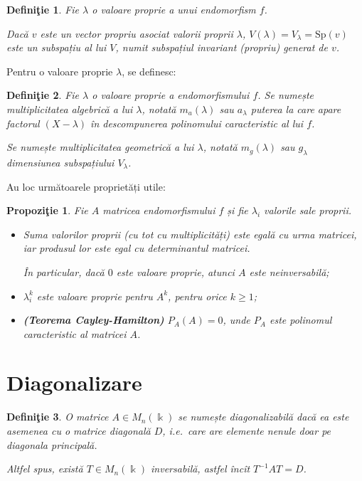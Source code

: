 \documentclass[11pt,a4paper]{article}
\theoremstyle{dotless}
\newtheorem{proposition}{Propozi\c{t}ie}[section]
\theoremstyle{dotlessdr}
\newtheorem{definition}{Defini\c{t}ie}[section]
\begin{document}
\begin{definition}\label{def:sp-invar}
  Fie $\lambda$ o valoare proprie a unui endomorfism $f$.

  Dacă $v$ este un vector propriu asociat valorii proprii $\lambda$,
  $V(\lambda) = V_\lambda = \mathrm{Sp}(v)$ este un subspațiu al lui
  $V$, numit \emph{subspațiul invariant} (propriu) generat de $v$.
\end{definition}

Pentru o valoare proprie $\lambda$, se definesc:

\begin{definition}\label{def:ma-mg}
  Fie $\lambda$ o valoare proprie a endomorfismului $f$. Se numește
  \emph{multiplicitatea algebrică} a lui $\lambda$, notată $m_a(\lambda)$
  sau $a_\lambda$ puterea la care apare factorul $(X - \lambda)$ în descompunerea
  polinomului caracteristic al lui $f$.

  Se numește \emph{multiplicitatea geometrică} a lui $\lambda$, notată $m_g(\lambda)$
  sau $g_\lambda$ dimensiunea subspațiului $V_\lambda$.
\end{definition}

Au loc următoarele proprietăți utile:
\begin{proposition}\label{pr:vvp}
  Fie $A$ matricea endomorfismului $f$ și fie $\lambda_i$ valorile sale proprii.

  \begin{itemize}
  \item Suma valorilor proprii (cu tot cu multiplicități) este egală cu urma
    matricei, iar produsul lor este egal cu determinantul matricei.

    În particular, dacă $0$ este valoare proprie, atunci $A$ este neinversabilă;
  \item $\lambda_i^k$ este valoare proprie pentru $A^k$, pentru orice $k \geq 1$;
  \item \textbf{(Teorema Cayley-Hamilton)} $P_A(A) = 0$, unde $P_A$ este polinomul
    caracteristic al matricei $A$.
  \end{itemize}
\end{proposition}


\section{Diagonalizare}
\label{sec:diag}

\begin{definition}\label{def:diag}
  O matrice $A \in M_n(\Bbbk)$ se numește \emph{diagonalizabilă} dacă ea este
  asemenea cu o matrice diagonală $D$, i.e.\ care are elemente nenule doar pe
  diagonala principală.

  Altfel spus, există $T \in M_n(\Bbbk)$ inversabilă, astfel încît $T^{-1}AT = D$.
\end{definition}
\end{document}

